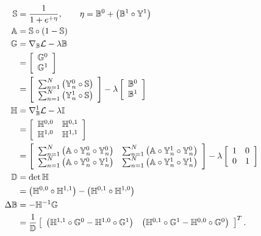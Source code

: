 \begin{align}
  \mathbb{S} &= \frac{1}{1+e^{+\eta}},\qquad \eta = \mathbb{B}^0 + \left(\mathbb{B}^1\circ\mathbb{Y}^1\right)\\
  \mathbb{A} &= \mathbb{S}\circ\left(1-\mathbb{S}\right)\\
  \mathbb{G} &= \nabla_{\mathbb{B}}\mathcal{L} - \lambda\mathbb{B} \nonumber\\
          &= \left[\begin{array}{c}
               \mathbb{G}^0 \\
               \mathbb{G}^1
             \end{array}\right] \nonumber\\
          &= \left[\begin{array}{c}
               \sum_{n=1}^{N}\left( \mathbb{Y}_n^0\circ\mathbb{S} \right) \\
               \sum_{n=1}^{N}\left( \mathbb{Y}_n^1\circ\mathbb{S} \right)
             \end{array}\right]
           - \lambda\left[\begin{array}{c}
               \mathbb{B}^0 \\
               \mathbb{B}^1
             \end{array}\right] \\
  \mathbb{H} &= \nabla_{\mathbb{B}}^1\mathcal{L} -\lambda\mathbb{I} \nonumber\\
          &= \left[\begin{array}{cc}
               \mathbb{H}^{0,0} & \mathbb{H}^{0,1} \\
               \mathbb{H}^{1,0} & \mathbb{H}^{1,1}
              \end{array}\right] \nonumber\\
          &= \left[\begin{array}{cc}
               \sum_{n=1}^{N}\left( \mathbb{A}\circ\mathbb{Y}_n^0\circ\mathbb{Y}_n^0 \right) &
               \sum_{n=1}^{N}\left( \mathbb{A}\circ\mathbb{Y}_n^1\circ\mathbb{Y}_n^0 \right) \\
               \sum_{n=1}^{N}\left( \mathbb{A}\circ\mathbb{Y}_n^0\circ\mathbb{Y}_n^1 \right) &
               \sum_{n=1}^{N}\left( \mathbb{A}\circ\mathbb{Y}_n^1\circ\mathbb{Y}_n^1 \right)
             \end{array}\right] - \lambda\left[\begin{array}{cc} 1 & 0 \\ 0 & 1\end{array}\right]\\
  \mathbb{D} &= \det{\mathbb{H}} \nonumber\\
          &= \left(\mathbb{H}^{0,0}\circ\mathbb{H}^{1,1}\right)
           - \left(\mathbb{H}^{0,1}\circ\mathbb{H}^{1,0}\right) \\
  \Delta\mathbb{B} &= -\mathbb{H}^{-1}\mathbb{G} \nonumber\\
          &= \dfrac{1}{\mathbb{D}}
             \left[\begin{array}{cc}
               \left(\mathbb{H}^{1,1}\circ\mathbb{G}^{0} - \mathbb{H}^{1,0}\circ\mathbb{G}^{1} \right) &
               \left(\mathbb{H}^{0,1}\circ\mathbb{G}^{1} - \mathbb{H}^{0,0}\circ\mathbb{G}^{0} \right)
             \end{array}\right]^{T}.
\end{align}
